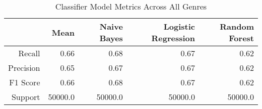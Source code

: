 \begin{table}[h]
    \centering
    \begin{tabular}{r|r|r|r|r}
         & Mean & Naive Bayes & Logistic Regression & Random Forest \\\hline
        Recall     & 0.66 & 0.68 & 0.67 & 0.62 \\
        Precision  & 0.65 & 0.67 & 0.67 & 0.62 \\
        F1 Score   & 0.66 & 0.68 & 0.67 & 0.62 \\
        Support    & 50000.0 & 50000.0 & 50000.0 & 50000.0
\end{tabular}
    \caption{Classifier Model Metrics Across All Genres}
    \label{tab:mode_aggregation_metrics_table}
\end{table}